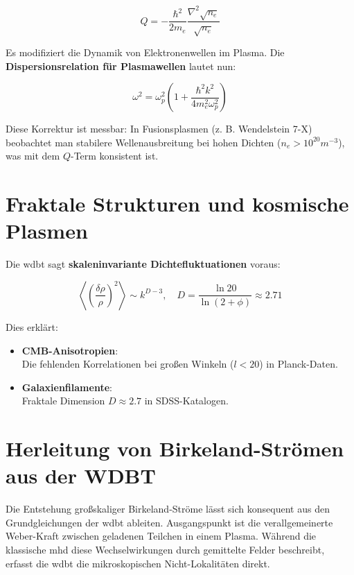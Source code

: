 \begin{equation}
    \label{eq:quantenpotential}
    Q = -\frac{\hbar^2}{2m_e} \frac{\nabla^2 \sqrt{n_e}}{\sqrt{n_e}}
\end{equation}

Es modifiziert die Dynamik von Elektronenwellen im Plasma. Die \textbf{Dispersionsrelation für Plasmawellen} lautet nun:

\begin{equation}
    \label{eq:dispersionrelation}
    \omega^2 = \omega_p^2 \left( 1 + \frac{\hbar^2 k^2}{4 m_e^2 \omega_p^2} \right)
\end{equation}

Diese Korrektur ist messbar: In Fusionsplasmen (z. B. Wendelstein 7-X) beobachtet man stabilere Wellenausbreitung bei hohen Dichten ($n_e > 10^{20} m^{-3}$), was mit dem $Q$-Term
konsistent ist.

\section{Fraktale Strukturen und kosmische Plasmen}
Die \gls{wdbt} sagt \textbf{skaleninvariante Dichtefluktuationen} voraus:

\begin{equation}
    \label{eq:dichtefluktuation}
    \left\langle \left( \frac{\delta \rho}{\rho} \right)^2 \right\rangle \sim k^{D-3}, \quad D = \frac{\ln 20}{\ln(2+\phi)} \approx 2.71
\end{equation}

Dies erklärt:

\begin{itemize}
    \item \textbf{CMB-Anisotropien}:\\Die fehlenden Korrelationen bei großen Winkeln ($l < 20$) in Planck-Daten.
    \item \textbf{Galaxienfilamente}:\\Fraktale Dimension $D \approx 2.7$ in SDSS-Katalogen.
\end{itemize}

\section{Herleitung von Birkeland-Strömen aus der WDBT}
Die Entstehung großskaliger Birkeland-Ströme lässt sich konsequent aus den Grundgleichungen der \gls{wdbt} ableiten. Ausgangspunkt ist die verallgemeinerte Weber-Kraft zwischen
geladenen Teilchen in einem Plasma. Während die klassische \gls{mhd} diese Wechselwirkungen durch gemittelte Felder beschreibt, erfasst die \gls{wdbt} die mikroskopischen
Nicht-Lokalitäten direkt.

